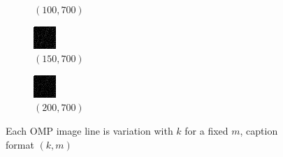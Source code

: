\documentclass[a4paper, landscape]{article}
\begin{document}
\begin{figure}[H]
\begin{subfigure}{0.12\linewidth}
        \caption{$(100, 700)$}
    \end{subfigure}
    \begin{subfigure}{0.12\linewidth}
        \centering
        \includegraphics[width=\linewidth]{omp/k = 150, m = 700.png}
        \caption{$(150, 700)$}
    \end{subfigure}
    \begin{subfigure}{0.12\linewidth}
        \centering
        \includegraphics[width=\linewidth]{omp/k = 200, m = 700.png}
        \caption{$(200, 700)$}
    \end{subfigure}
    \caption{Each OMP image line is variation with $k$ for a fixed $m$, caption format $(k, m)$}
    \label{fig:om}
\end{figure}
\end{document}
